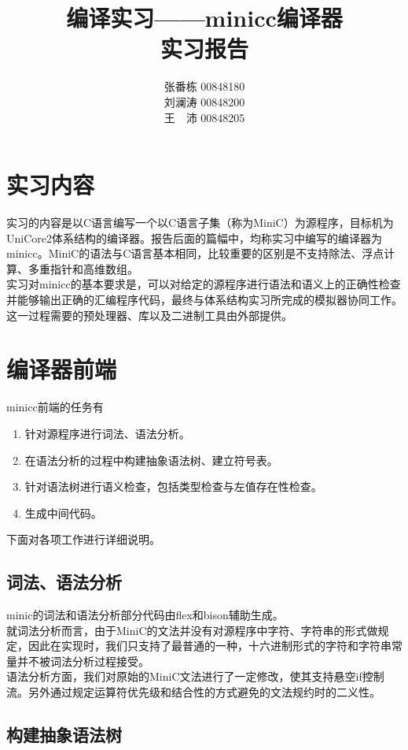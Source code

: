 \documentclass[12pt,a4paper,Flow]{report}
\begin{document}
\title{\textbf{编译实习——minicc编译器\\实习报告}}
\author{张番栋 00848180\\刘澜涛 00848200\\王　沛 00848205}
\date{}
\maketitle
\tableofcontents
\newpage
\chapter{实习内容}
实习的内容是以C语言编写一个以C语言子集（称为MiniC）为源程序，目标机为UniCore2体系结构的编译器。报告后面的篇幅中，均称实习中编写的编译器为minicc。MiniC的语法与C语言基本相同，比较重要的区别是不支持除法、浮点计算、多重指针和高维数组。\\
\indent 实习对minicc的基本要求是，可以对给定的源程序进行语法和语义上的正确性检查并能够输出正确的汇编程序代码，最终与体系结构实习所完成的模拟器协同工作。这一过程需要的预处理器、库以及二进制工具由外部提供。
\chapter{编译器前端}
minicc前端的任务有
\begin{enumerate}
\item 针对源程序进行词法、语法分析。
\item 在语法分析的过程中构建抽象语法树、建立符号表。
\item 针对语法树进行语义检查，包括类型检查与左值存在性检查。
\item 生成中间代码。
\end{enumerate}
下面对各项工作进行详细说明。
\newpage
\section{词法、语法分析}
minic的词法和语法分析部分代码由flex和bison辅助生成。\\
\indent 就词法分析而言，由于MiniC的文法并没有对源程序中字符、字符串的形式做规定，因此在实现时，我们只支持了最普通的一种，十六进制形式的字符和字符串常量并不被词法分析过程接受。\\
\indent 语法分析方面，我们对原始的MiniC文法进行了一定修改，使其支持悬空if控制流。另外通过规定运算符优先级和结合性的方式避免的文法规约时的二义性。
\section{构建抽象语法树}
\end{document}
